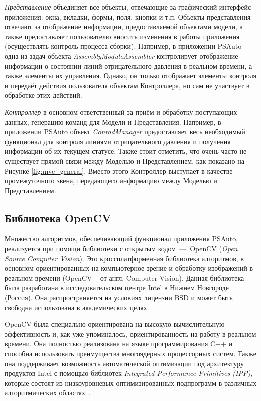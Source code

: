 \emph{Представление} объединяет все объекты, отвечающие за графический интерфейс приложения: окна, вкладки, формы, поля, кнопки и т.п. Объекты представления отвечают за отображение информации, предоставляемой объектами модели, а также предоставляет пользователю вносить изменения в работы приложения (осуществлять контроль процесса сборки). Например, в приложении PSAuto одна из задач объекта \emph{AssemblyModuleAssembler} контролирует отображение информации о состоянии линий отрицательного давления в реальном времени, а также элементы их управления. Однако, он только отображает элементы контроля и передаёт действия пользователя объектам Контроллера, но сам не участвует в обработке этих действий.

\emph{Контроллер} в основном ответственный за приём и обработку поступающих данных, генерацию команд для Модели и Представления. Например, в приложении PSAuto объект \emph{ConradManager} предоставляет весь необходимый функционал для контроля линиями отрицательного давления и получения информации об их текущем статусе. Также стоит отметить, что очень часто не существует прямой связи между Моделью и Представлением, как показано на Рисунке \ref{fig:mvc_general}. Вместо этого Контроллер выступает в качестве промежуточного звена, передающего информацию между Моделью и Представлением.

\subsection{Библиотека OpenCV}

Множество алгоритмов, обеспечивающий функционал приложения PSAuto, реализуется при помощи библиотеки с открытым кодом~---~OpenCV (\textit{Open Source Computer Vision}). Это кроссплатформенная библиотека алгоритмов, в основном ориентированных на компьютерное зрение и обработку изображений в реальном времени (OpenCV -- от англ. Computer Vision). Данная библиотека была разработана в исследовательском центре Intel в Нижнем Новгороде (Россия). Она распространяется на условиях лицензии BSD и может быть свободна использована в академических целях.

OpenCV была специально ориентирована на высокую вычислительную эффективность и, как уже упоминалось, ориентированность на работу в реальном времени. Она полностью реализована на языке программирования C++ и способна использовать преимущества многоядерных процессорных систем. Также она поддерживает возможность автоматической оптимизации под архитектуру продуктов Intel с помощью библиотек \textit{Integrated Performance Primitives (IPP)}, которые состоят из низкоуровневых оптимизированных подпрограмм в различных алгоритмических областях~\cite{kaehler2016learning}.

